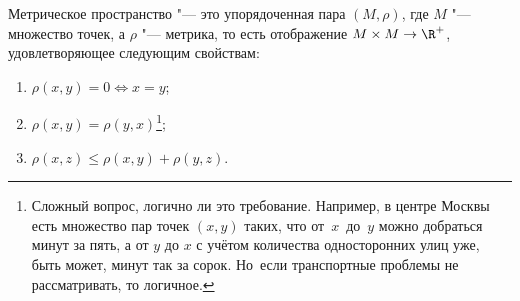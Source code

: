 
	Метрическое пространство "--- это упорядоченная пара $(M,\rho)$, где $M$ "--- множество точек, а $\rho$ "--- метрика, то есть отображение
	$M\times M\to \R^+$, удовлетворяющее следующим свойствам:
	\begin{enumerate}
	  \item $\rho(x,y)=0\iff x= y$;
	  \item $\rho(x,y)=\rho(y,x)$\footnote{Сложный вопрос, логично ли это требование. Например, в центре Москвы есть множество пар точек $(x,y)$ таких,
	  что от~$x$~до~$y$ можно добраться минут за пять, а от $y$ до $x$ с учётом количества односторонних улиц уже, быть может, минут так за сорок. Но~если транспортные проблемы не рассматривать, то логичное.};
	  \item $\rho(x,z)\leq\rho(x,y)+\rho(y,z)$.
	\end{enumerate}
	